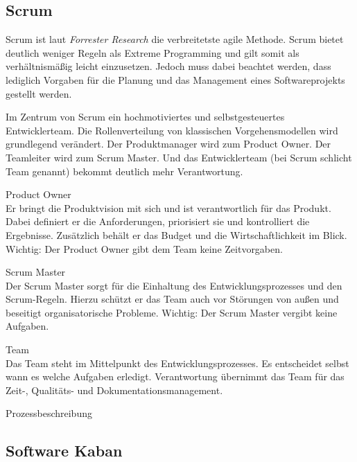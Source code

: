 \subsection{Scrum}
Scrum ist laut \emph{Forrester Research} die verbreitetste agile Methode. \cite{bib:ane} Scrum bietet deutlich weniger Regeln als Extreme Programming und gilt somit als verhältnismäßig leicht einzusetzen. Jedoch muss dabei beachtet werden, dass lediglich Vorgaben für die Planung und das Management eines Softwareprojekts gestellt werden. 

Im Zentrum von Scrum ein hochmotiviertes und selbstgesteuertes Entwicklerteam. Die Rollenverteilung von klassischen Vorgehensmodellen wird grundlegend verändert. Der Produktmanager wird zum Product Owner. Der Teamleiter wird zum Scrum Master. Und das Entwicklerteam (bei Scrum schlicht Team genannt) bekommt deutlich mehr Verantwortung.

\begin{description}
\item{Product Owner}\\
Er bringt die Produktvision mit sich und ist verantwortlich für das Produkt. Dabei definiert er die Anforderungen, priorisiert sie und kontrolliert die Ergebnisse. Zusätzlich behält er das Budget und die Wirtschaftlichkeit im Blick. Wichtig: Der Product Owner gibt dem Team keine Zeitvorgaben.

\item{Scrum Master}\\
Der Scrum Master sorgt für die Einhaltung des Entwicklungsprozesses und den Scrum-Regeln. Hierzu schützt er das Team auch vor Störungen von außen und beseitigt organisatorische Probleme. Wichtig: Der Scrum Master vergibt keine Aufgaben.

\item{Team}\\
Das Team steht im Mittelpunkt des Entwicklungsprozesses. Es entscheidet selbst wann es welche Aufgaben erledigt. Verantwortung übernimmt das Team für das Zeit-, Qualitäts- und Dokumentationsmanagement.
\end{description}

Prozessbeschreibung

\subsection{Software Kaban}

